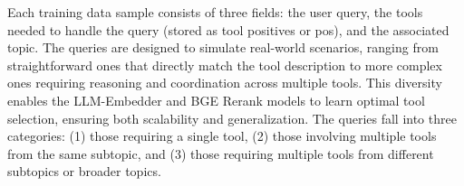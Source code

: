 \documentclass[runningheads]{llncs}
\begin{document}
Each training data sample consists of three fields: the user query, the tools needed to handle the query (stored as tool positives or pos), and the associated topic. The queries are designed to simulate real-world scenarios, ranging from straightforward ones that directly match the tool description to more complex ones requiring reasoning and coordination across multiple tools. This diversity enables the LLM-Embedder and BGE Rerank models to learn optimal tool selection, ensuring both scalability and generalization. The queries fall into three categories: (1) those requiring a single tool, (2) those involving multiple tools from the same subtopic, and (3) those requiring multiple tools from different subtopics or broader topics.


\end{document}
